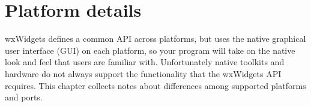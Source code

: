 \chapter{Platform details}\label{platformdetails}
%
\setfooter{\thepage}{}{}{}{}{\thepage}%

wxWidgets defines a common API across platforms, but uses the native graphical
user interface (GUI) on each platform, so your program will take on the native
look and feel that users are familiar with. Unfortunately native toolkits and
hardware do not always support the functionality that the wxWidgets API
requires. This chapter collects notes about differences among supported platforms and ports.









